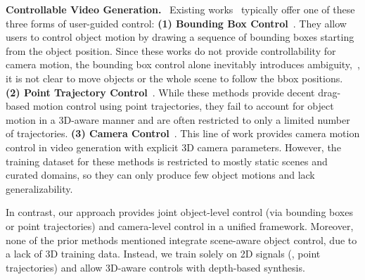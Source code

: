 \vspace*{1mm}
\noindent \textbf{Controllable Video Generation.}  \
Existing works~\cite{wang2024boximator,wu2025draganything,xing2024make,wang2024motionctrl} typically offer one of these three forms of user-guided control: 
%
\textbf{(1) Bounding Box Control}~\cite{wang2024boximator,ma2024trailblazer,huang2023factor,li2023trackdiffusion,wu2024motionbooth}.
They allow users to control object motion by drawing a sequence of bounding boxes starting from the object position. Since these works do not provide controllability for camera motion, the bounding box control alone inevitably introduces ambiguity,~\eg, it is not clear to move objects or the whole scene to follow the bbox positions.
%
\textbf{(2) Point Trajectory Control}~\cite{wu2025draganything,niu2025mofa,wang2024motionctrl,mou2024revideo,qiu2024freetraj}.
While these methods provide decent drag-based motion control using point trajectories, they fail to account for object motion in a 3D-aware manner and are often restricted to only a limited number of trajectories.
\textbf{(3) Camera Control}~\cite{wang2024motionctrl,he2024cameractrl,yu2024viewcrafter,wang2024akira,bahmani2024ac3d}.
This line of work provides camera motion control in video generation with explicit 3D camera parameters.  However, the training dataset for these methods is restricted to mostly static scenes and curated domains, so they can only produce few object motions and lack generalizability. 





In contrast, our approach provides joint object-level control (via bounding boxes or point trajectories) and camera-level control in a unified framework. 
Moreover, none of the prior methods mentioned integrate scene-aware object control, due to a lack of 3D training data. 
Instead, 
we train solely on 2D signals (\eg, point trajectories) and allow 3D-aware controls with depth-based synthesis.
